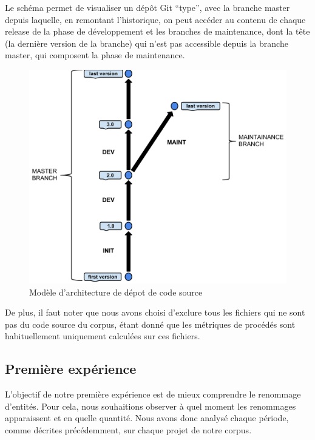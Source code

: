 Le schéma  permet de visualiser un dépôt Git ``type'', avec la branche master depuis laquelle, en remontant l'historique, on peut accéder au contenu de chaque release de la phase de développement et les branches de maintenance, dont la tête (la dernière version de la branche) qui n'est pas accessible depuis la branche master, qui composent la phase de maintenance.\\

\begin{figure}[h]
  \centering
  \includegraphics[scale=0.5]{data/figures/periods.pdf}
	\caption{Modèle d'architecture de dépot de code source}
	\label{fig:model}
\end{figure}

De plus, il faut noter que nous avons choisi d'exclure tous les fichiers qui ne sont pas du code source du corpus, étant donné que les métriques de procédés sont habituellement uniquement calculées sur ces fichiers. \\

\subsection{Première expérience}

 L'objectif de notre première expérience est de mieux comprendre le renommage d'entités. Pour cela, nous souhaitions observer à quel moment les renommages apparaissent et en quelle quantité. Nous avons donc analysé chaque période, comme décrites précédemment, sur chaque projet de notre corpus.\\ 


